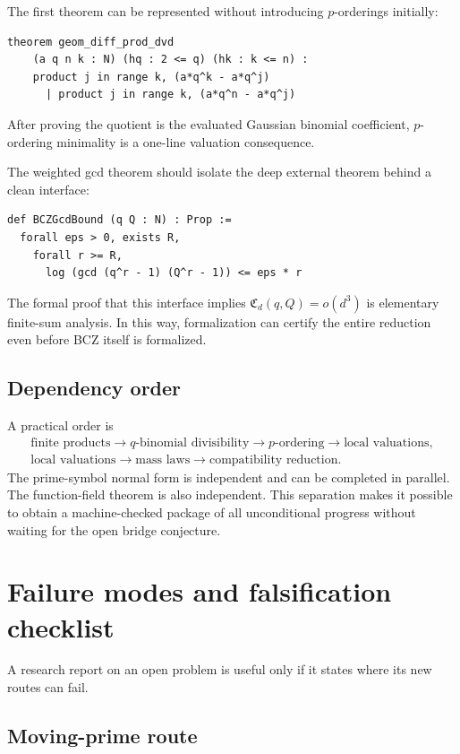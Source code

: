 \documentclass[11pt]{article}
\theoremstyle{definition}
\theoremstyle{remark}
\begin{document}
The first theorem can be represented without introducing $p$-orderings
initially:
\begin{verbatim}
theorem geom_diff_prod_dvd
    (a q n k : N) (hq : 2 <= q) (hk : k <= n) :
    product j in range k, (a*q^k - a*q^j)
      | product j in range k, (a*q^n - a*q^j)
\end{verbatim}
After proving the quotient is the evaluated Gaussian binomial coefficient,
$p$-ordering minimality is a one-line valuation consequence.

The weighted gcd theorem should isolate the deep external theorem behind a
clean interface:
\begin{verbatim}
def BCZGcdBound (q Q : N) : Prop :=
  forall eps > 0, exists R,
    forall r >= R,
      log (gcd (q^r - 1) (Q^r - 1)) <= eps * r
\end{verbatim}
The formal proof that this interface implies
$\mathfrak C_d(q,Q)=o(d^3)$ is elementary finite-sum analysis.  In this way,
formalization can certify the entire reduction even before BCZ itself is
formalized.

\subsection{Dependency order}

A practical order is
\[
 \begin{gathered}
 \text{finite products}\longrightarrow q\text{-binomial divisibility}
 \longrightarrow p\text{-ordering}\longrightarrow\text{local valuations},\\
 \text{local valuations}\longrightarrow\text{mass laws}
 \longrightarrow\text{compatibility reduction}.
 \end{gathered}
\]
The prime-symbol normal form is independent and can be completed in parallel.
The function-field theorem is also independent.  This separation makes it
possible to obtain a machine-checked package of all unconditional progress
without waiting for the open bridge conjecture.

\section{Failure modes and falsification checklist}

A research report on an open problem is useful only if it states where its
new routes can fail.

\subsection{Moving-prime route}
\end{document}
